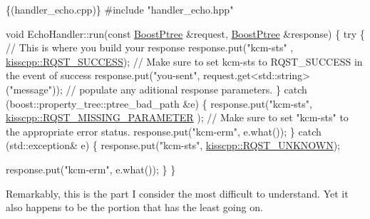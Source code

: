 \begin{DoxyCode}
\{(handler\_echo.cpp)\}
#include \textcolor{stringliteral}{"handler\_echo.hpp"}

\textcolor{keywordtype}{void} EchoHandler::run(\textcolor{keyword}{const} \hyperlink{boost__ptree_8hpp_ab36820650b8e0db36402aea80485633c}{BoostPtree} &request, \hyperlink{boost__ptree_8hpp_ab36820650b8e0db36402aea80485633c}{BoostPtree}
       &response)
\{
  \textcolor{keywordflow}{try} \{
    \textcolor{comment}{// This is where you build your response}
    response.put(\textcolor{stringliteral}{"kcm-sts"} , \hyperlink{namespacekisscpp_af5792fb0f68695c1a1e7a4c720d9262ea48f403b25d056ead863e1bb74664b388}{kisscpp::RQST\_SUCCESS});      
                \textcolor{comment}{// Make sure to set kcm-sts to RQST\_SUCCESS in the event of success}
    response.put(\textcolor{stringliteral}{"you-sent"}, request.get<std::string>(\textcolor{stringliteral}{"message"}));  \textcolor{comment}{// populate
       any aditional response parameters.}
  \} \textcolor{keywordflow}{catch} (boost::property\_tree::ptree\_bad\_path &e) \{
    response.put(\textcolor{stringliteral}{"kcm-sts"}, \hyperlink{namespacekisscpp_af5792fb0f68695c1a1e7a4c720d9262ea3ad7cafe8fc0329ea5edde0ebf5c807e}{kisscpp::RQST\_MISSING\_PARAMETER}
      );       \textcolor{comment}{// Make sure to set "kcm-sts" to the appropriate error status.}
    response.put(\textcolor{stringliteral}{"kcm-erm"}, e.what());
  \} \textcolor{keywordflow}{catch} (std::exception& e) \{
    response.put(\textcolor{stringliteral}{"kcm-sts"}, \hyperlink{namespacekisscpp_af5792fb0f68695c1a1e7a4c720d9262ea8b54c6e47b50ce90a375d79b957f5ddb}{kisscpp::RQST\_UNKNOWN});       
                   
    response.put(\textcolor{stringliteral}{"kcm-erm"}, e.what());
  \}
\}
\end{DoxyCode}


Remarkably, this is the part I consider the most difficult to understand. Yet it also happens to be the portion that has the least going on. 